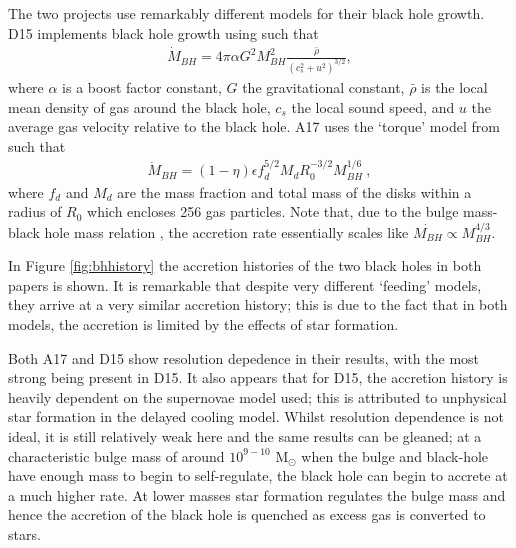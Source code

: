 The two projects use remarkably different models for their black hole growth.
D15 implements black hole growth using \citet{bondi_spherically_1952} such
that
\begin{align}
  \dot{M}_{BH} = 4\pi \alpha G^2 M_{BH}^2
                 \frac{\bar{\rho}}{(c_s^2 + u^2)^{3/2}},
  \label{eqn:d15:mdot}
\end{align}
where $\alpha$ is a boost factor constant, $G$ the gravitational constant,
$\bar{\rho}$ is the local mean density of gas around the black hole, $c_s$ the
local sound speed, and $u$ the average gas velocity relative to the black hole.
A17 uses the `torque' model from \citet{hopkins_analytic_2011} such that
\begin{align}
  \dot{M}_{BH} = (1 - \eta) \epsilon f_d^{5/2} M_d R_0^{-3/2} M_{BH}^{1/6}~,
  \label{eqn:a17:mdot}
\end{align}
where $f_d$ and $M_d$ are the mass fraction and total mass of the disks within
a radius of $R_0$ which encloses 256 gas particles.
Note that, due to the bulge mass-black hole mass relation
\citep{haring_black_2004}, the accretion rate essentially scales like
$\dot{M_{BH}} \propto M_{BH}^{4/3}$.

In Figure \ref{fig:bhhistory} the accretion histories of the two black holes
in both papers is shown. It is remarkable that despite very different `feeding'
models, they arrive at a very similar accretion history; this is due to the
fact that in both models, the accretion is limited by the effects of star
formation.

Both A17 and D15 show resolution depedence in their results, with the most
strong being present in D15. It also appears that for D15, the accretion
history is heavily dependent on the supernovae model used; this is attributed
to unphysical star formation in the delayed cooling model. Whilst resolution
dependence is not ideal, it is still relatively weak here and the same results
can be gleaned; at a characteristic bulge mass of around $10^{9-10}$ M$_\odot$
when the bulge and black-hole have enough mass to begin to self-regulate, the
black hole can begin to accrete at a much higher rate. At lower masses star
formation regulates the bulge mass and hence the accretion of the black hole is
quenched as excess gas is converted to stars.
